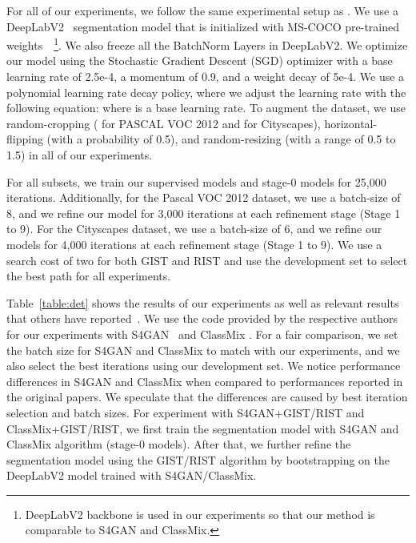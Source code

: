 \documentclass[10pt, conference, compsocconf]{IEEEtran}
\begin{document}
For all of our experiments, we follow the same experimental setup as \cite{hung2019adversarial,mittal2019semi,olsson2020classmix}. We use a DeepLabV2~\cite{chen2017deeplab} segmentation model that is initialized with MS-COCO pre-trained weights~\cite{lin2014microsoft}~\footnote[5]{DeepLabV2 backbone is used in our experiments so that our method is comparable to S4GAN and ClassMix. }. We also freeze all the BatchNorm Layers in DeepLabV2. We optimize our model using the Stochastic Gradient Descent (SGD) optimizer with a base learning rate of 2.5e-4, a momentum of 0.9, and a weight decay of 5e-4. We use a polynomial learning rate decay policy, where we adjust the learning rate with the following equation:
 where  is a base learning rate. To augment the dataset, we use random-cropping ( for PASCAL VOC 2012 and  for Cityscapes), horizontal-flipping (with a probability of 0.5), and random-resizing (with a range of 0.5 to 1.5) in all of our experiments.

For all subsets, we train our supervised models and stage-0 models for 25,000 iterations. 
Additionally, for the Pascal VOC 2012 dataset, we use a batch-size of 8, and we refine our model for 3,000 iterations at each refinement stage (Stage 1 to 9). For the Cityscapes dataset, we use a batch-size of 6, and we refine our models for 4,000 iterations at each refinement stage (Stage 1 to 9). We use a search cost of two for both GIST and RIST and use the development set to select the best path for all experiments.

Table~\ref{table:det} shows the results of our experiments as well as relevant
results that others have reported~\cite{hung2019adversarial,mittal2019semi,french2019semi,olsson2020classmix}. We use the code provided by the respective authors for our experiments with S4GAN~\cite{mittal2019semi} and ClassMix \cite{olsson2020classmix}. For a fair comparison, we set the batch size for S4GAN and ClassMix to match with our experiments, and we also select the best iterations
using our development set.
We notice performance differences in S4GAN and ClassMix when compared to performances reported in the original papers. We speculate that the differences are caused by best iteration selection and batch sizes.
For experiment with S4GAN+GIST/RIST and ClassMix+GIST/RIST, we 
first train the segmentation model with S4GAN and ClassMix algorithm (stage-0 models). After that, we further refine the segmentation model using the GIST/RIST algorithm by bootstrapping on the DeepLabV2 model trained with S4GAN/ClassMix. 
\end{document}
